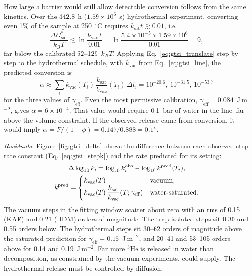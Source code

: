 How large a barrier would still allow detectable conversion follows from the same kinetics. Over
the 442.8~h ($1.59\times10^{6}$~s) hydrothermal experiment, converting even 1\% of the sample at
250~$^\circ$C requires $k_{\mathrm{sat}}t\gtrsim0.01$, i.e.
\begin{equation}
  \frac{\Delta G^{*}_{\mathrm{sat}}}{k_BT} \lesssim \ln\frac{k_{\mathrm{vac}}\,t}{0.01}
  = \ln\frac{5.4\times10^{-5}\times1.59\times10^{6}}{0.01} = 9 ,
\end{equation}
far below the calibrated 52--129~$k_BT$. Applying Eq.~\eqref{eq:gtsi_translate} step by step to the
hydrothermal schedule, with $k_{\mathrm{vac}}$ from Eq.~\eqref{eq:gtsi_line}, the predicted conversion is
\begin{equation}
  \alpha \approx \sum_i k_{\mathrm{vac}}(T_i)\,\frac{k_{\mathrm{sat}}}{k_{\mathrm{vac}}}(T_i)\,\Delta t_i
  = 10^{-20.6},\ 10^{-31.5},\ 10^{-53.7}
\end{equation}
for the three values of $\gamma_{\mathrm{eff}}$. Even the most permissive calibration,
$\gamma_{\mathrm{eff}} = 0.084$~J\,m$^{-2}$, gives $\alpha = 6\times10^{-4}$. That value would require
0.1~bar of water in the line, far above the volume constraint. If the observed release came from
conversion, it would imply $\alpha = F/(1-\phi) = 0.147/0.888 = 0.17$.

\textit{Residuals.} Figure~\ref{fig:gtsi_delta} shows the difference between each observed step
rate constant (Eq.~\eqref{eq:gtsi_stepk}) and the rate predicted for its setting:
\begin{gather}
  \Delta\log_{10}k_i = \log_{10}k_i^{\mathrm{obs}} - \log_{10}k^{\mathrm{pred}}(T_i), \notag\\
  k^{\mathrm{pred}} =
  \begin{cases}
    k_{\mathrm{vac}}(T) & \text{vacuum},\\
    k_{\mathrm{vac}}(T)\,\dfrac{k_{\mathrm{sat}}}{k_{\mathrm{vac}}}(T;\gamma_{\mathrm{eff}}) & \text{water-saturated}.
  \end{cases}
\end{gather}
The vacuum steps in the fitting window scatter about zero with an rms of 0.15 (KAF) and 0.21
(HDM) orders of magnitude. The trap-isolated steps sit 0.30 and 0.55 orders below. The hydrothermal
steps sit 30--62 orders of magnitude above the saturated prediction for
$\gamma_{\mathrm{eff}}=0.16$~J\,m$^{-2}$, and 20--41 and 53--105 orders above for 0.14 and
0.19~J\,m$^{-2}$. Far more $^3$He is released in water than decomposition, as constrained by the vacuum
experiments, could supply. The hydrothermal release must be controlled by diffusion.

